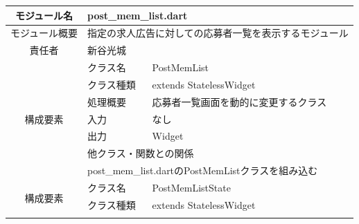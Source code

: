 \begin{table}[H]
  \centering
  \begin{tabular}{|c|l|l|} \hline
    モジュール名                & \multicolumn{2}{l|}{post\_mem\_list.dart}                                                                           \\ \hline
    モジュール概要               & \multicolumn{2}{p{12cm}|}{指定の求人広告に対しての応募者一覧を表示するモジュール}                                                               \\ \hline
    責任者                   & \multicolumn{2}{l|}{新谷光城}                                                                                           \\ \hline
    \multirow{7}{*}{構成要素} & クラス名                                                                & PostMemList                                   \\ \cline{2-3}
                          & クラス種類                                                               & extends StatelessWidget                       \\ \cline{2-3}
                          & 処理概要                                                                & \multicolumn{1}{p{12cm}|}{応募者一覧画面を動的に変更するクラス} \\ \cline{2-3}
                          & 入力                                                                  & なし                                            \\ \cline{2-3}
                          & 出力                                                                  & Widget                                        \\ \cline{2-3}
                          & \multicolumn{2}{l|}{他クラス・関数との関係}                                                                                    \\ \cline{2-3}
                          & \multicolumn{2}{p{14cm}|}{post\_mem\_list.dartのPostMemListクラスを組み込む}                                                 \\ \hline
    \multirow{7}{*}{構成要素} & クラス名                                                                & PostMemListState                              \\ \cline{2-3}
                          & クラス種類                                                               & extends StatelessWidget                       \\ \cline{2-3}

\end{tabular}
\end{table}
